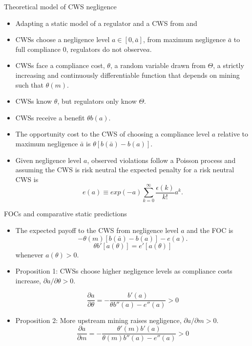 \documentclass{beamer}
\begin{document}
\begin{frame}{Theoretical model of CWS negligence}

\begin{itemize}
    \item Adapting a static model of a regulator and a CWS from \cite{kang2021understanding} and \cite{mookherjee1994marginal}
    \item CWSs choose a negligence level $a \in [0,\bar{a}]$, from maximum negligence $\bar{a}$ to full compliance 0, regulators do not observe$a$. 
    \item CWSs face a compliance cost, $\theta$, a random variable drawn from $\Theta$, a strictly increasing and continuously differentiable function that depends on mining such that $\theta (m)$. 
    \item CWSs know $\theta$, but regulators only know $\Theta$. 
    \item CWSs receive a benefit $\theta b(a)$.
    \item The opportunity cost to the CWS of choosing a compliance level $a$ relative to maximum negligence $\bar{a}$ is $\theta [b(\bar{a})-b(a)]$.

    \item Given negligence level $a$, observed violations follow a Poisson process and assuming the CWS is risk neutral the expected penalty for a risk neutral CWS is 
\begin{equation}
    e(a)\equiv exp(-a)\sum^\infty_{k=0}\frac{\epsilon(k)}{k!}a^k.
\end{equation}
\end{itemize}
\end{frame}

\begin{frame}{FOCs and comparative static predictions}
\begin{itemize}
\item The expected payoff to the CWS from negligence level $a$ and the FOC is
\begin{equation}\label{eq:cws_benefitcost}
    -\theta(m)[b(\bar{a})-b(a)]-e(a).
\end{equation}
\begin{equation}\label{cws_foc}
    \theta b'[a(\theta)]=e'[a(\theta)]
\end{equation}
whenever $a(\theta)>0$.

\item Proposition 1: CWSs choose higher negligence levels as compliance costs increase, $\partial a/ \partial \theta>0$.

\[\frac{\partial a}{\partial \theta}=-\frac{b'(a)}{\theta b''(a)-e''(a)}>0\]


\item Proposition 2: More upstream mining raises negligence, $\partial a/\partial m >0$.
\[\frac{\partial a}{\partial m}=-\frac{\theta'(m)b'(a)}{\theta(m) b''(a)-e''(a)}>0\]
\end{itemize}
\end{frame}
\end{document}
